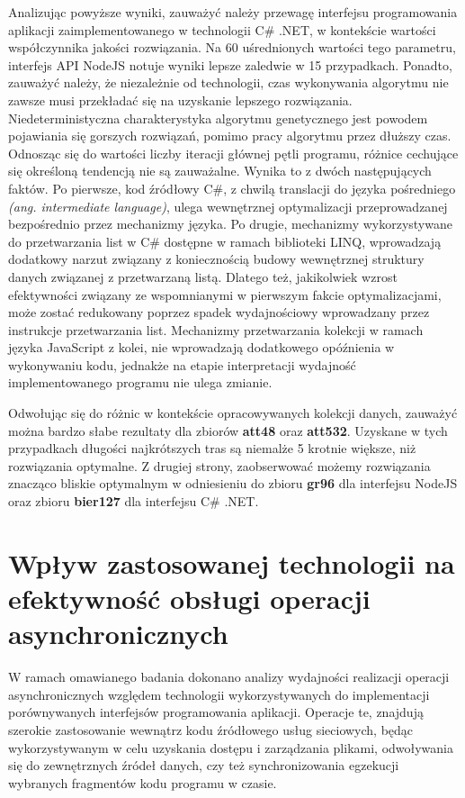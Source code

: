 Analizując powyższe wyniki, zauważyć należy przewagę interfejsu programowania aplikacji zaimplementowanego w technologii C\# .NET, w kontekście wartości współczynnika jakości rozwiązania. Na 60 uśrednionych wartości tego parametru, interfejs API NodeJS notuje wyniki lepsze zaledwie w 15 przypadkach. Ponadto, zauważyć należy, że niezależnie od technologii, czas wykonywania algorytmu nie zawsze musi przekładać się na uzyskanie lepszego rozwiązania. Niedeterministyczna charakterystyka algorytmu genetycznego jest powodem pojawiania się gorszych rozwiązań, pomimo pracy algorytmu przez dłuższy czas. Odnosząc się do wartości liczby iteracji głównej pętli programu, różnice cechujące się określoną tendencją nie są zauważalne. Wynika to z dwóch następujących faktów. Po pierwsze, kod źródłowy C\#, z chwilą translacji do języka pośredniego \textit{(ang. intermediate language)}, ulega wewnętrznej optymalizacji przeprowadzanej bezpośrednio przez mechanizmy języka. Po drugie, mechanizmy wykorzystywane do przetwarzania list w C\# dostępne w ramach biblioteki LINQ, wprowadzają dodatkowy narzut związany z koniecznością budowy wewnętrznej struktury danych związanej z przetwarzaną listą. Dlatego też, jakikolwiek wzrost efektywności związany ze wspomnianymi w pierwszym fakcie optymalizacjami, może zostać redukowany poprzez spadek wydajnościowy wprowadzany przez instrukcje przetwarzania list. Mechanizmy przetwarzania kolekcji w ramach języka JavaScript z kolei, nie wprowadzają dodatkowego opóźnienia w wykonywaniu kodu, jednakże na etapie interpretacji wydajność implementowanego programu nie ulega zmianie.

Odwołując się do różnic w kontekście opracowywanych kolekcji danych, zauważyć można bardzo słabe rezultaty dla zbiorów \textbf{att48} oraz \textbf{att532}. Uzyskane w tych przypadkach długości najkrótszych tras są niemalże 5 krotnie większe, niż rozwiązania optymalne. Z drugiej strony, zaobserwować możemy rozwiązania znacząco bliskie optymalnym w odniesieniu do zbioru \textbf{gr96} dla interfejsu NodeJS oraz zbioru \textbf{bier127} dla interfejsu C\# .NET.
\section{Wpływ zastosowanej technologii na efektywność obsługi operacji asynchronicznych}
W ramach omawianego badania dokonano analizy wydajności realizacji operacji asynchronicznych względem technologii wykorzystywanych do implementacji porównywanych interfejsów programowania aplikacji. Operacje te, znajdują szerokie zastosowanie wewnątrz kodu źródłowego usług sieciowych, będąc wykorzystywanym w celu uzyskania dostępu i zarządzania plikami, odwoływania się do zewnętrznych źródeł danych, czy też synchronizowania egzekucji wybranych fragmentów kodu programu w czasie.

